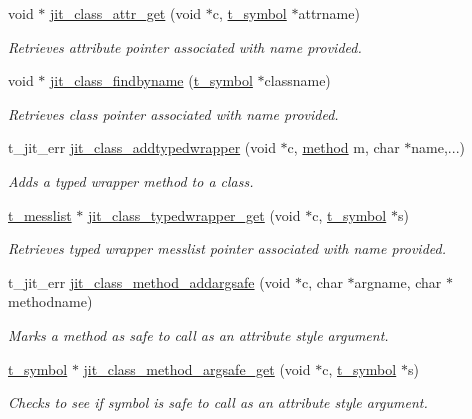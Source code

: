 \begin{DoxyCompactItemize}
void $\ast$ \hyperlink{group__classmod_gaf35d0b9ca105219561cb18114f4002ef}{jit\_\-class\_\-attr\_\-get} (void $\ast$c, \hyperlink{structt__symbol}{t\_\-symbol} $\ast$attrname)
\begin{DoxyCompactList}\small\item\em Retrieves attribute pointer associated with name provided. \item\end{DoxyCompactList}\item 
void $\ast$ \hyperlink{group__classmod_ga63eb9d25f881cd6fba11e24f9ac9b02f}{jit\_\-class\_\-findbyname} (\hyperlink{structt__symbol}{t\_\-symbol} $\ast$classname)
\begin{DoxyCompactList}\small\item\em Retrieves class pointer associated with name provided. \item\end{DoxyCompactList}\item 
t\_\-jit\_\-err \hyperlink{group__classmod_gac5594cb68b903b894e54ea9edb56ad61}{jit\_\-class\_\-addtypedwrapper} (void $\ast$c, \hyperlink{group__datatypes_gac26ba0a173b50597f5738132e059b42d}{method} m, char $\ast$name,...)
\begin{DoxyCompactList}\small\item\em Adds a typed wrapper method to a class. \item\end{DoxyCompactList}\item 
\hyperlink{structt__messlist}{t\_\-messlist} $\ast$ \hyperlink{group__classmod_ga0486ba2dc02d1ff1358f0401956d3080}{jit\_\-class\_\-typedwrapper\_\-get} (void $\ast$c, \hyperlink{structt__symbol}{t\_\-symbol} $\ast$s)
\begin{DoxyCompactList}\small\item\em Retrieves typed wrapper messlist pointer associated with name provided. \item\end{DoxyCompactList}\item 
t\_\-jit\_\-err \hyperlink{group__classmod_gafcda1659cb3299a25f0f3f2a570a0d2f}{jit\_\-class\_\-method\_\-addargsafe} (void $\ast$c, char $\ast$argname, char $\ast$methodname)
\begin{DoxyCompactList}\small\item\em Marks a method as safe to call as an attribute style argument. \item\end{DoxyCompactList}\item 
\hyperlink{structt__symbol}{t\_\-symbol} $\ast$ \hyperlink{group__classmod_ga5ace294def3c0e31d3890d2f9be1af68}{jit\_\-class\_\-method\_\-argsafe\_\-get} (void $\ast$c, \hyperlink{structt__symbol}{t\_\-symbol} $\ast$s)
\begin{DoxyCompactList}\small\item\em Checks to see if symbol is safe to call as an attribute style argument. \item\end{DoxyCompactList}\end{DoxyCompactItemize}


